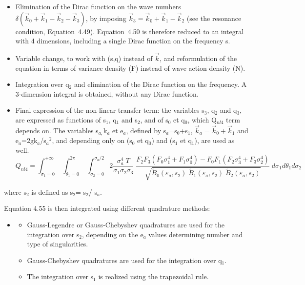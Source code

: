 \begin{itemize}
\item  Elimination of the Dirac function on the wave numbers $\delta \left(\vec{k}_{0} +\vec{k}_{1} -\vec{k}_{2} -\vec{k}_{3} \right)$, by imposing $\vec{k}_{3} =\vec{k}_{0} +\vec{k}_{1} -\vec{k}_{2} $ (see the resonance condition, Equation~4.49). Equation~4.50 is therefore reduced to an integral with 4 dimensions, including a single Dirac function on the frequency s.

\item  Variable change, to work with (s,q) instead of $\vec{k}$, and reformulation of the equation in terms of variance density (F) instead of wave action density (N).

\item  Integration over q${}_{2}$ and elimination of the Dirac function on the frequency. A 3-dimension integral is obtained, without any Dirac function.

\item  Final expression of the non-linear transfer term: the variables s${}_{3}$, q${}_{2}$ and q${}_{3}$, are expressed as functions of s${}_{1}$, q${}_{1}$ and s${}_{2}$, and of s${}_{0}$ et q${}_{0}$, which Q${}_{nl4}$ term depends on. The variables s${}_{a, }$k${}_{a}$ et e${}_{a}$, defined by s${}_{a}$=s${}_{0}$+s${}_{1}$, $\vec{k}_{a} =\vec{k}_{0} +\vec{k}_{1} $ and e${}_{a}$=2gk${}_{a}$/s${}_{a}$${}^{2}$, and depending only on (s${}_{0}$ et q${}_{0}$) and (s${}_{1}$ et q${}_{1}$), are used as well.
\begin{equation} \label{GrindEQ__4_62_}
Q_{nl4} =\int _{\sigma _{1} =0}^{+\infty }\; \int _{\theta _{1} =0}^{2\pi }\; \int _{\sigma _{2} =0}^{\sigma _{a} /2}   2\frac{\sigma _{a}^{4} \; T}{\sigma _{1} \sigma _{2} \sigma _{3} } \; \frac{F_{2} F_{3} (F_{0} \sigma _{1}^{4} +F_{1} \sigma _{0}^{4} )-F_{0} F_{1} (F_{2} \sigma _{3}^{4} +F_{3} \sigma _{2}^{4} )}{\sqrt{\tilde{B}_{0} \left(\varepsilon _{a} ,s_{2} \right)\; \tilde{B}_{1} \left(\varepsilon _{a} ,s_{2} \right)\; \tilde{B}_{2} \left(\varepsilon _{a} ,s_{2} \right)} } \; d\sigma _{1} d\theta _{1} d\sigma _{2}
\end{equation}
\end{itemize}
where s${}_{2}$ is defined as s${}_{2}$= s${}_{2}$/ s${}_{a}$.

 Equation 4.55 is then integrated using different quadrature methods:

\begin{itemize}
\item \begin{itemize}
\item  Gauss-Legendre or Gauss-Chebyshev quadratures are used for the integration over s${}_{2}$, depending on the e${}_{a}$ values determining number and type of singularities.

\item  Gauss-Chebyshev quadratures are used for the integration over q${}_{1}$.

\item  The integration over s${}_{1}$ is realized using the trapezoidal rule.
\end{itemize}
\end{itemize}

